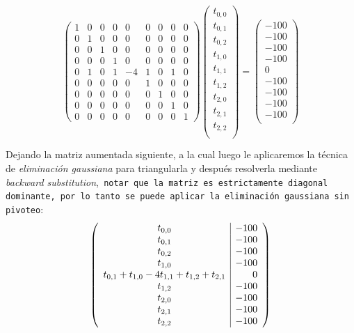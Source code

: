 $$
\left( \begin{array}{ccccccccc}
1 & 0 & 0 & 0 & 0 & 0 & 0 & 0 & 0 \\
0 & 1 & 0 & 0 & 0 & 0 & 0 & 0 & 0 \\
0 & 0 & 1 & 0 & 0 & 0 & 0 & 0 & 0 \\ 
0 & 0 & 0 & 1 & 0 & 0 & 0 & 0 & 0 \\
0 & 1 & 0 & 1 & -4 & 1 & 0 & 1 & 0 \\
0 & 0 & 0 & 0 & 0 & 1 & 0 & 0 & 0 \\ 
0 & 0 & 0 & 0 & 0 & 0 & 1 & 0 & 0 \\
0 & 0 & 0 & 0 & 0 & 0 & 0 & 1 & 0 \\
0 & 0 & 0 & 0 & 0 & 0 & 0 & 0 & 1
\end{array} \right)	\left( \begin{array}{c}
t_{0,0} \\
t_{0,1} \\
t_{0,2} \\
t_{1,0} \\
t_{1,1} \\
t_{1,2} \\
t_{2,0} \\
t_{2,1} \\
t_{2,2} \\
\end{array} \right) = \left( \begin{array}{c}
-100 \\
-100 \\
-100 \\
-100 \\
0 \\
-100 \\
-100 \\
-100 \\
-100 \\
\end{array} \right)
$$
\par
Dejando la matriz aumentada siguiente, a la cual luego le aplicaremos la técnica de \textit{eliminación gaussiana} para triangularla y después resolverla mediante \textit{backward substitution},\texttt{ notar que la matriz es estrictamente diagonal dominante, por lo tanto se puede aplicar la eliminación gaussiana sin pivoteo}:
\vspace{\baselineskip}
$$
\left( \begin{array}{c | r}
t_{0,0} & -100\\
t_{0,1} & -100\\
t_{0,2} & -100 \\
t_{1,0} & -100\\
t_{0,1} + t_{1,0} - 4t_{1,1} + t_{1,2} + t_{2,1} & 0\\
t_{1,2} & -100\\
t_{2,0} & -100\\
t_{2,1} & -100\\
t_{2,2} & -100\\
\end{array} \right)
$$

